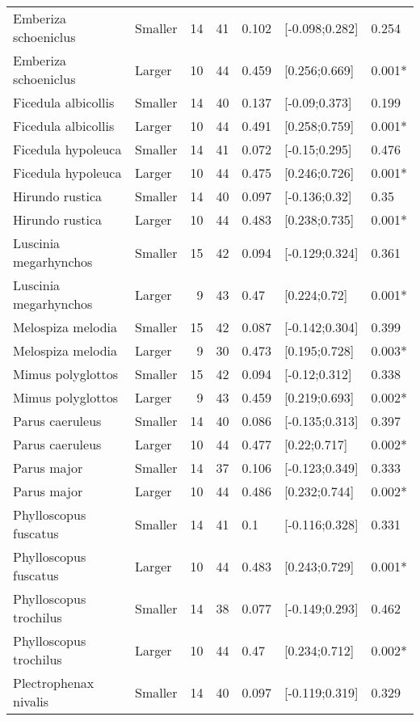\documentclass{article}
\begin{document}
\begin{table}[H]
\begin{tabular}{llrrlll}
  Emberiza schoeniclus & Smaller & 14 & 41 & 0.102 & [-0.098;0.282] & 0.254 \\ 
  Emberiza schoeniclus & Larger & 10 & 44 & 0.459 & [0.256;0.669] & 0.001* \\ 
  Ficedula albicollis & Smaller & 14 & 40 & 0.137 & [-0.09;0.373] & 0.199 \\ 
  Ficedula albicollis & Larger & 10 & 44 & 0.491 & [0.258;0.759] & 0.001* \\ 
  Ficedula hypoleuca & Smaller & 14 & 41 & 0.072 & [-0.15;0.295] & 0.476 \\ 
  Ficedula hypoleuca & Larger & 10 & 44 & 0.475 & [0.246;0.726] & 0.001* \\ 
  Hirundo rustica & Smaller & 14 & 40 & 0.097 & [-0.136;0.32] & 0.35 \\ 
  Hirundo rustica & Larger & 10 & 44 & 0.483 & [0.238;0.735] & 0.001* \\ 
  Luscinia megarhynchos & Smaller & 15 & 42 & 0.094 & [-0.129;0.324] & 0.361 \\ 
  Luscinia megarhynchos & Larger & 9 & 43 & 0.47 & [0.224;0.72] & 0.001* \\ 
  Melospiza melodia & Smaller & 15 & 42 & 0.087 & [-0.142;0.304] & 0.399 \\ 
  Melospiza melodia & Larger & 9 & 30 & 0.473 & [0.195;0.728] & 0.003* \\ 
  Mimus polyglottos & Smaller & 15 & 42 & 0.094 & [-0.12;0.312] & 0.338 \\ 
  Mimus polyglottos & Larger & 9 & 43 & 0.459 & [0.219;0.693] & 0.002* \\ 
  Parus caeruleus & Smaller & 14 & 40 & 0.086 & [-0.135;0.313] & 0.397 \\ 
  Parus caeruleus & Larger & 10 & 44 & 0.477 & [0.22;0.717] & 0.002* \\ 
  Parus major & Smaller & 14 & 37 & 0.106 & [-0.123;0.349] & 0.333 \\ 
  Parus major & Larger & 10 & 44 & 0.486 & [0.232;0.744] & 0.002* \\ 
  Phylloscopus fuscatus & Smaller & 14 & 41 & 0.1 & [-0.116;0.328] & 0.331 \\ 
  Phylloscopus fuscatus & Larger & 10 & 44 & 0.483 & [0.243;0.729] & 0.001* \\ 
  Phylloscopus trochilus & Smaller & 14 & 38 & 0.077 & [-0.149;0.293] & 0.462 \\ 
  Phylloscopus trochilus & Larger & 10 & 44 & 0.47 & [0.234;0.712] & 0.002* \\ 
  Plectrophenax nivalis & Smaller & 14 & 40 & 0.097 & [-0.119;0.319] & 0.329 \\ 

\end{tabular}
\end{table}
\end{document}
